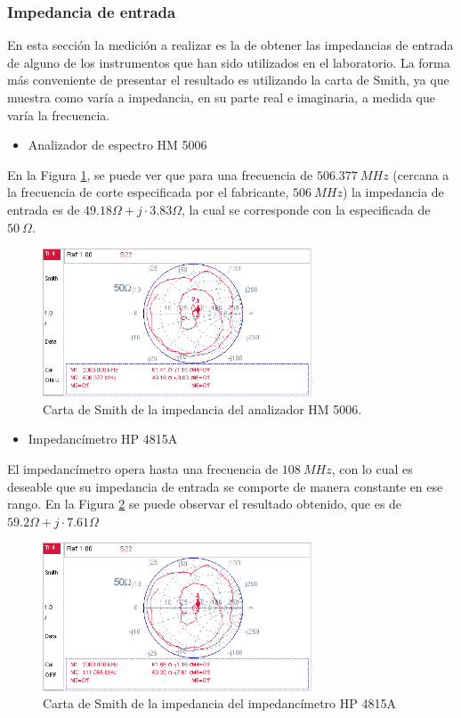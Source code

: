 \documentclass[a4paper,10pt]{article}
\begin{document}
		\subsubsection{Impedancia de entrada}
		\indent En esta secci\'on la medici\'on a realizar es la de obtener las 
		impedancias de entrada de alguno de los instrumentos que han sido 
		utilizados en el laboratorio. La forma m\'as conveniente de presentar el
		resultado es utilizando la carta de Smith, ya que muestra como var\'ia a
		impedancia, en su parte real e  imaginaria, a medida que var\'ia la 
		frecuencia.
		
		\begin{itemize}
			\item Analizador de espectro HM 5006
		\end{itemize}
		
		\indent En la Figura \ref{tranferenciacHM}, se puede ver que para una
		frecuencia de $506.377~MHz$ (cercana a la frecuencia de corte especificada por el fabricante, $506~MHz$) la 
		impedancia de entrada es de $49.18\Omega+j\cdot3.83\Omega$, la cual se corresponde con la 
		especificada de $50~\Omega$.
		
		\begin{figure}[!htb]
			\centering
			\includegraphics[width=8cm]
			{Imagenes/SmithimpedancaiHM5006.png}
			\caption{Carta de Smith de la impedancia del analizador HM 5006.}
			\label{tranferenciacHM} 
		\end{figure}		
		\begin{itemize}
			\item Impedanc\'imetro HP 4815A
		\end{itemize}
		
		\indent El impedanc\'imetro opera hasta una frecuencia de $108~MHz$, con
		lo cual es deseable que su impedancia de entrada se comporte de manera 
		constante en ese rango. En la Figura 
		\ref{tranferenciaimpedanciamiterro} se puede observar el resultado 
		obtenido, que es de $59.2\Omega+j\cdot7.61\Omega$ 
		
		\begin{figure}[!htb]
			\centering
			\includegraphics[width=8cm]
			{Imagenes/Smithimpedancaiimpedancimetro.png}
			\caption{Carta de Smith de la impedancia del impedanc\'imetro HP 
			4815A}
			\label{tranferenciaimpedanciamiterro} 
		\end{figure}		
\end{document}
